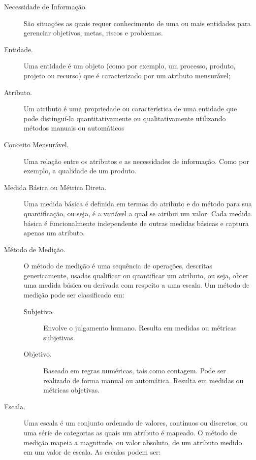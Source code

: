 \begin{description}
	\item [Necessidade de Informação.]  São situações as quais requer 
	 conhecimento de uma ou mais entidades para gerenciar objetivos, metas, 
	 riscos e problemas.
	
	 \item [Entidade.]  Uma entidade é um objeto (como por exemplo, um processo,
	 produto, projeto ou recurso) que é caracterizado por um atributo 
	 mensurável;
	 
	 \item [Atributo.]  Um atributo é uma propriedade ou característica de uma 
	 entidade que pode distinguí-la quantitativamente ou qualitativamente 
	 utilizando métodos manuais ou automáticos
	
	 \item [Conceito Mensurável.]  Uma relação entre os atributos e as 
	 necessidades de informação. Como por exemplo, a qualidade de um produto. 
	 
	 \item [Medida Básica ou Métrica Direta.] Uma medida básica é definida em 
	 termos do atributo e do método para sua quantificação, ou seja, é a 
	 variável a qual se atribui um valor. Cada medida básica é funcionalmente 
	 independente de outras medidas básicas e captura apenas um atributo. 
	 \item [Método de Medição.] O método de medição é uma sequência de 
	 operações, descritas genericamente, usadas qualificar ou quantificar um 
	 atributo, ou seja, obter uma medida básica ou derivada com respeito a uma 
	 escala. Um método de medição pode ser classificado em:
	
		\begin{description}
		 \item [Subjetivo.] Envolve o julgamento humano. Resulta em medidas ou 
		 métricas subjetivas.
		 \item [Objetivo.] Baseado em regras numéricas, tais como contagem. 
		 Pode ser realizado de forma manual ou automática. Resulta em medidas 
		 ou métricas objetivas.
		\end{description}
	 \item [Escala.] Uma escala é um conjunto ordenado de valores, contínuos ou 
	 discretos, ou uma série de categorias as quais um atributo é mapeado. 
	 O método de medição mapeia a magnitude, ou valor absoluto, de um atributo 
	 medido em um valor de escala. As escalas podem ser: 
	

\end{description}
